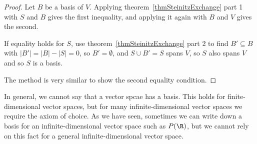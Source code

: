 \documentclass[../Main.tex]{subfiles}
\begin{document}
\begin{proof}
    Let $B$ be a basis of $V$. Applying theorem~\ref{thmSteinitzExchange} part 1 with $S$ and $B$ gives the first inequality, and applying it again with $B$ and $V$ gives the second.

    If equality holds for $S$, use theorem~\ref{thmSteinitzExchange} part 2 to find $B' \subseteq B$ with $|B'| = |B| - |S| = 0$, so $B' = \emptyset$, and $S \cup B' = S$ spans $V$, so $S$ also spans $V$ and so $S$ is a basis.

    The method is very similar to show the second equality condition.
\end{proof}
\begin{remark}
    In general, we cannot say that a vector spcae has a basis. This holds for finite-dimensional vector spaces, but for many infinite-dimensional vector spaces we require the axiom of choice. As we have seen, sometimes we can write down a basis for an infinite-dimensional vector space such as $P(\R)$, but we cannot rely on this fact for a general infinite-dimensional vector space.
\end{remark}
\end{document}
